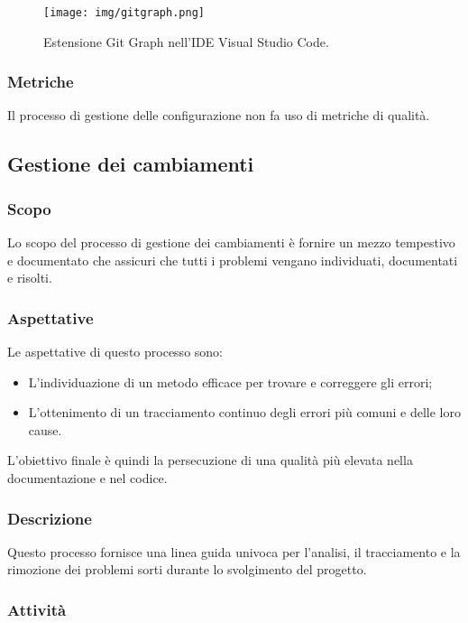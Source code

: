 \documentclass[../norme-di-progetto.tex]{subfiles}
\begin{document}
\begin{figure}[H]
  \centering
  \texttt{[image: img/gitgraph.png]}
  \label{fig:github}
  \caption{Estensione Git Graph nell'IDE Visual Studio Code.}
\end{figure}

\subsubsection{Metriche}
Il processo di gestione delle configurazione non fa uso di metriche di qualità.

\subsection{Gestione dei cambiamenti}
\subsubsection{Scopo}
Lo scopo del processo di gestione dei cambiamenti è fornire un mezzo tempestivo e documentato che assicuri che tutti i problemi vengano individuati, documentati e risolti.

\subsubsection{Aspettative}
Le aspettative di questo processo sono:
\begin{itemize}
  \item L'individuazione di un metodo efficace per trovare e correggere gli errori;
  \item L'ottenimento di un tracciamento continuo degli errori più comuni e delle loro cause.
\end{itemize}
L'obiettivo finale è quindi la persecuzione di una qualità più elevata nella documentazione e nel codice.

\subsubsection{Descrizione}
Questo processo fornisce una linea guida univoca per l'analisi, il tracciamento e la rimozione dei problemi sorti durante lo svolgimento del progetto.

\subsubsection{Attività}
\end{document}
